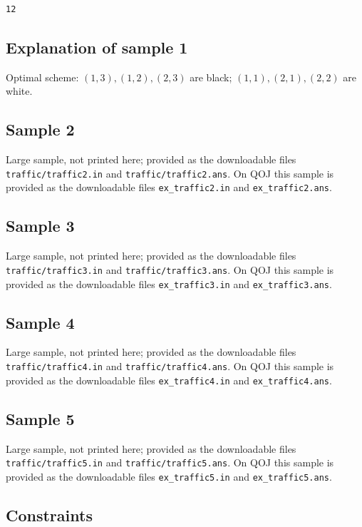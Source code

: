 \documentclass[11pt]{article}
\begin{document}
\begin{verbatim}
12
\end{verbatim}

\subsection*{Explanation of sample 1}

Optimal scheme:
$(1, 3), (1, 2), (2, 3)$ are black;
$(1, 1), (2, 1), (2, 2)$ are white.

\subsection*{Sample 2}

Large sample, not printed here;
provided as the downloadable files \texttt{traffic/traffic2.in} and \texttt{traffic/traffic2.ans}.
On QOJ this sample is provided as the downloadable files
\texttt{ex\_traffic2.in} and \texttt{ex\_traffic2.ans}.

\subsection*{Sample 3}

Large sample, not printed here;
provided as the downloadable files \texttt{traffic/traffic3.in} and \texttt{traffic/traffic3.ans}.
On QOJ this sample is provided as the downloadable files
\texttt{ex\_traffic3.in} and \texttt{ex\_traffic3.ans}.

\subsection*{Sample 4}

Large sample, not printed here;
provided as the downloadable files \texttt{traffic/traffic4.in} and \texttt{traffic/traffic4.ans}.
On QOJ this sample is provided as the downloadable files
\texttt{ex\_traffic4.in} and \texttt{ex\_traffic4.ans}.

\subsection*{Sample 5}

Large sample, not printed here;
provided as the downloadable files \texttt{traffic/traffic5.in} and \texttt{traffic/traffic5.ans}.
On QOJ this sample is provided as the downloadable files
\texttt{ex\_traffic5.in} and \texttt{ex\_traffic5.ans}.

\subsection*{Constraints}
\end{document}

